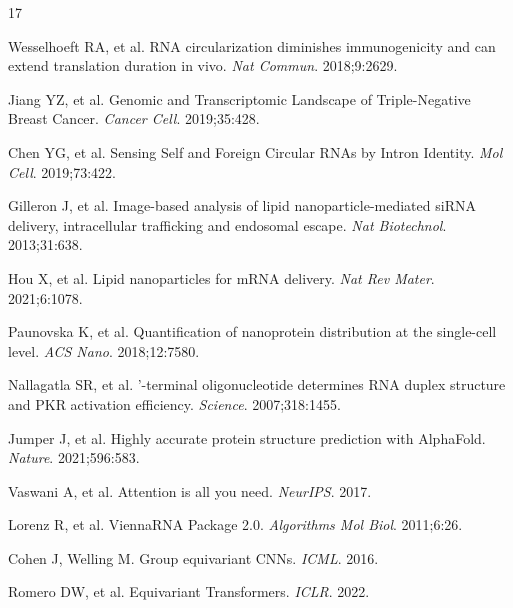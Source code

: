 \documentclass[11pt,a4paper]{article}
\begin{document}
\begin{thebibliography}{17}

Wesselhoeft RA, et al.
\newblock RNA circularization diminishes immunogenicity and can extend translation duration in vivo.
\newblock \emph{Nat Commun}. 2018;9:2629.

Jiang YZ, et al.
\newblock Genomic and Transcriptomic Landscape of Triple-Negative Breast Cancer.
\newblock \emph{Cancer Cell}. 2019;35:428.

Chen YG, et al.
\newblock Sensing Self and Foreign Circular RNAs by Intron Identity.
\newblock \emph{Mol Cell}. 2019;73:422.

Gilleron J, et al.
\newblock Image-based analysis of lipid nanoparticle-mediated siRNA delivery, intracellular trafficking and endosomal escape.
\newblock \emph{Nat Biotechnol}. 2013;31:638.

Hou X, et al.
\newblock Lipid nanoparticles for mRNA delivery.
\newblock \emph{Nat Rev Mater}. 2021;6:1078.

Paunovska K, et al.
\newblock Quantification of nanoprotein distribution at the single-cell level.
\newblock \emph{ACS Nano}. 2018;12:7580.

Nallagatla SR, et al.
'-terminal oligonucleotide determines RNA duplex structure and PKR activation efficiency.
\newblock \emph{Science}. 2007;318:1455.

Jumper J, et al.
\newblock Highly accurate protein structure prediction with AlphaFold.
\newblock \emph{Nature}. 2021;596:583.

Vaswani A, et al.
\newblock Attention is all you need.
\newblock \emph{NeurIPS}. 2017.

Lorenz R, et al.
\newblock ViennaRNA Package 2.0.
\newblock \emph{Algorithms Mol Biol}. 2011;6:26.

Cohen J, Welling M.
\newblock Group equivariant CNNs.
\newblock \emph{ICML}. 2016.

Romero DW, et al.
\newblock Equivariant Transformers.
\newblock \emph{ICLR}. 2022.


\end{thebibliography}
\end{document}
